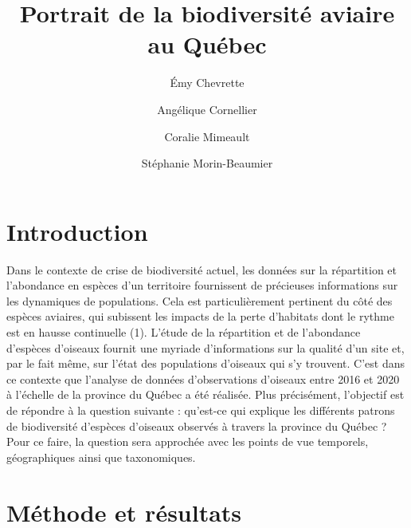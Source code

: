 \documentclass[9pt,twocolumn,twoside,]{pnas-new}
\title{Portrait de la biodiversité aviaire au Québec}
\author[a]{Émy Chevrette}
\author[a]{Angélique Cornellier}
\author[a]{Coralie Mimeault}
\author[a]{Stéphanie Morin-Beaumier}
\affil[a]{Université de Sherbrooke, Département de biologie, 2500
Boulevard de l'Université, Sherbrooke, Québec, J1K 2R1}
\begin{document}
\verticaladjustment{-2pt}



\maketitle
\thispagestyle{firststyle}


\acknow{}

\hypertarget{introduction}{%
\section{Introduction}\label{introduction}}

Dans le contexte de crise de biodiversité actuel, les données sur la
répartition et l'abondance en espèces d'un territoire fournissent de
précieuses informations sur les dynamiques de populations. Cela est
particulièrement pertinent du côté des espèces aviaires, qui subissent
les impacts de la perte d'habitats dont le rythme est en hausse
continuelle (1). L'étude de la répartition et de l'abondance d'espèces
d'oiseaux fournit une myriade d'informations sur la qualité d'un site
et, par le fait même, sur l'état des populations d'oiseaux qui s'y
trouvent. C'est dans ce contexte que l'analyse de données d'observations
d'oiseaux entre 2016 et 2020 à l'échelle de la province du Québec a été
réalisée. Plus précisément, l'objectif est de répondre à la question
suivante : qu'est-ce qui explique les différents patrons de biodiversité
d'espèces d'oiseaux observés à travers la province du Québec ? Pour ce
faire, la question sera approchée avec les points de vue temporels,
géographiques ainsi que taxonomiques.

\hypertarget{muxe9thode-et-ruxe9sultats}{%
\section{Méthode et résultats}\label{muxe9thode-et-ruxe9sultats}}
\end{document}
